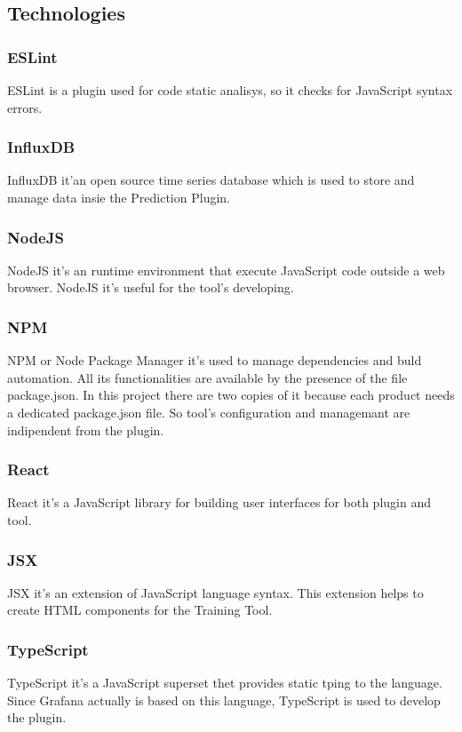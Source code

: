 \subsection{Technologies}
\subsubsection{ESLint}
ESLint is a plugin used for code static analisys, so it checks for JavaScript syntax errors.

\subsubsection{InfluxDB}
InfluxDB it'an open source time series database which is used to store and manage data insie the Prediction Plugin. 

\subsubsection{NodeJS}
NodeJS it's an runtime environment that execute JavaScript code outside a web browser. NodeJS it's useful for the tool's developing.

\subsubsection{NPM}
NPM or Node Package Manager it's used to manage dependencies and buld automation. All its functionalities are available by the presence of the file package.json. In this project there are two copies of it because each product needs a dedicated package.json file. So tool's configuration and managemant are indipendent from the plugin.

\subsubsection{React}
React it's a JavaScript library for building user interfaces for both plugin and tool.

\subsubsection{JSX}
JSX it's an extension of JavaScript language syntax. This extension helps to create HTML components for the Training Tool.

\subsubsection{TypeScript}
TypeScript it's a JavaScript superset thet provides static tping to the language. Since Grafana actually is based on this language, TypeScript is used to develop the plugin.

